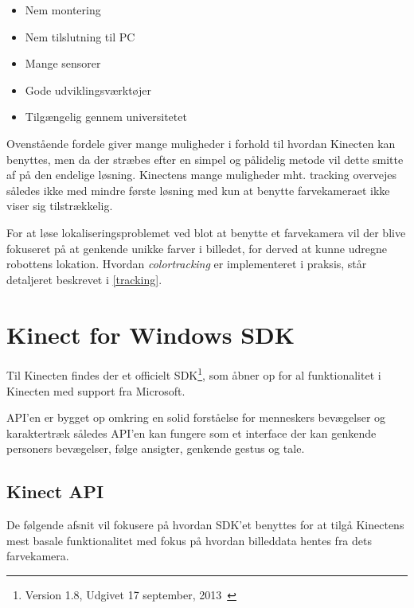 \begin{itemize}
\item Nem montering
\item Nem tilslutning til PC
\item Mange sensorer
\item Gode udviklingsværktøjer
\item Tilgængelig gennem universitetet
\end{itemize}


Ovenstående fordele giver mange muligheder i forhold til hvordan Kinecten kan benyttes, men da der stræbes efter en simpel og pålidelig metode vil dette smitte af på den endelige løsning.
Kinectens mange muligheder mht. tracking overvejes således ikke med mindre første løsning med kun at benytte farvekameraet ikke viser sig tilstrækkelig.

For at løse lokaliseringsproblemet ved blot at benytte et farvekamera vil der blive fokuseret på at genkende unikke farver i billedet, for derved at kunne udregne robottens lokation.
Hvordan \textit{colortracking} er implementeret i praksis, står detaljeret beskrevet i \cref{tracking}.


\section{Kinect for Windows SDK}
Til Kinecten findes der et officielt SDK\footnote{ Version 1.8, Udgivet 17 september, 2013~\cite{kinectSDK18}}, som åbner op for al funktionalitet i Kinecten med support fra Microsoft.

API'en er bygget op omkring en solid forståelse for menneskers bevægelser og karaktertræk således API'en kan fungere som et interface der kan genkende personers bevægelser, følge ansigter, genkende gestus og tale.

\subsection{Kinect API}\label{kinect:kinectapi}
De følgende afsnit vil fokusere på hvordan SDK'et benyttes for at tilgå Kinectens mest basale funktionalitet med fokus på hvordan billeddata hentes fra dets farvekamera.


